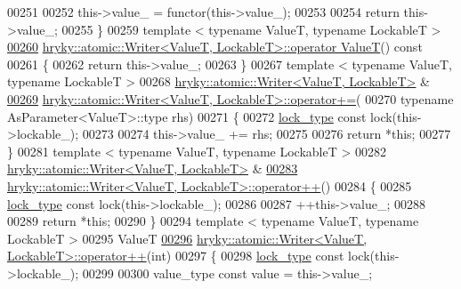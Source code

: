 \begin{DoxyCode}
{00251 
00252     this->value\_ = functor(this->value\_);
00253     
00254     \textcolor{keywordflow}{return} this->value\_;
00255 \}
00259 \textcolor{keyword}{template} < \textcolor{keyword}{typename} ValueT, \textcolor{keyword}{typename} LockableT >
\hypertarget{atomic__writer_8h_source_l00260}{}\hyperlink{group__atomic__operation_ga0d1ed1c369001d0f8bb4cdcacc0ea38b}{00260} \hyperlink{classhryky_1_1atomic_1_1_writer}{hryky::atomic::Writer<ValueT, LockableT>::operator ValueT}()\textcolor{keyword}{ const}
00261 \textcolor{keyword}{}\{
00262     \textcolor{keywordflow}{return} this->value\_;
00263 \}
00267 \textcolor{keyword}{template} < \textcolor{keyword}{typename} ValueT, \textcolor{keyword}{typename} LockableT >
00268 \hyperlink{classhryky_1_1atomic_1_1_writer}{hryky::atomic::Writer<ValueT, LockableT>} & 
\hypertarget{atomic__writer_8h_source_l00269}{}\hyperlink{group__atomic__operation_gaa862338a2dbded8f334c6e2aa0d45e88}{00269} \hyperlink{classhryky_1_1atomic_1_1_writer}{hryky::atomic::Writer<ValueT, LockableT>::operator+=}(
00270     \textcolor{keyword}{typename} AsParameter<ValueT>::type rhs)
00271 \{
00272     \hyperlink{classhryky_1_1exclusion_1_1_lock}{lock_type} \textcolor{keyword}{const} lock(this->lockable\_);
00273 
00274     this->value\_ += rhs;
00275     
00276     \textcolor{keywordflow}{return} *\textcolor{keyword}{this};
00277 \}
00281 \textcolor{keyword}{template} < \textcolor{keyword}{typename} ValueT, \textcolor{keyword}{typename} LockableT >
00282 \hyperlink{classhryky_1_1atomic_1_1_writer}{hryky::atomic::Writer<ValueT, LockableT>} & 
\hypertarget{atomic__writer_8h_source_l00283}{}\hyperlink{group__atomic__operation_ga32d8b99a3de61e36c7a0bc7aeb546a0d}{00283} \hyperlink{classhryky_1_1atomic_1_1_writer}{hryky::atomic::Writer<ValueT, LockableT>::operator++}()
00284 \{
00285     \hyperlink{classhryky_1_1exclusion_1_1_lock}{lock_type} \textcolor{keyword}{const} lock(this->lockable\_);
00286 
00287     ++this->value\_;
00288 
00289     \textcolor{keywordflow}{return} *\textcolor{keyword}{this};
00290 \}
00294 \textcolor{keyword}{template} < \textcolor{keyword}{typename} ValueT, \textcolor{keyword}{typename} LockableT >
00295 ValueT
\hypertarget{atomic__writer_8h_source_l00296}{}\hyperlink{group__atomic__operation_gaf9a6947db23cf27f26693b4a03030829}{00296} \hyperlink{classhryky_1_1atomic_1_1_writer}{hryky::atomic::Writer<ValueT, LockableT>::operator++}(\textcolor{keywordtype}{int})
00297 \{
00298     \hyperlink{classhryky_1_1exclusion_1_1_lock}{lock_type} \textcolor{keyword}{const} lock(this->lockable\_);
00299     
00300     value\_type \textcolor{keyword}{const} value = this->value\_;
}
\end{DoxyCode}
